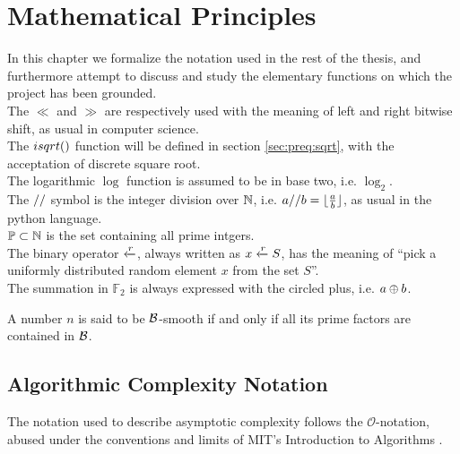 \chapter{Mathematical Principles\label{chap:preq}}

In this chapter we formalize the notation used in the rest of the thesis, and
furthermore attempt to discuss and study the elementary functions on which the
project has been grounded.
\\
The $\ll$ and $\gg$ are respectively used with the meaning of left and right
bitwise shift, as usual in computer science.
\\
The $\dsqrt$ function will be defined in section \ref{sec:preq:sqrt}, with the
acceptation of discrete square root.
\\
The logarithmic $\log$ function is assumed to be in base two, i.e. $\log_2$.
\\
The $//$ symbol is the integer division over $\mathbb{N}$, i.e.
$a // b = \lfloor\frac{a}{b}\rfloor$, as usual in the python language.
\\
$\mathbb{P} \subset \mathbb{N}$ is the set containing all prime intgers.
\\
The binary operator $\xleftarrow{r}$, always written as $x \xleftarrow{r} S$, has the
meaning of ``pick a uniformly distributed random element $x$ from the set $S$''.
\\
The summation in $\mathbb{F}_2$ is always expressed with the circled plus,
i.e. $a \oplus b$.




\begin{definition*}[Smoothness]
A number $n$ is said to be $\mathcal{B}$-smooth if and only if all its prime
factors are contained in $\mathcal{B}$.
\end{definition*}


\section{Algorithmic Complexity Notation}
The notation used to describe asymptotic complexity follows the $\mathcal{O}$-notation,
abused under the conventions and limits of MIT's Introduction to Algorithms
\cite{MITalg}.

